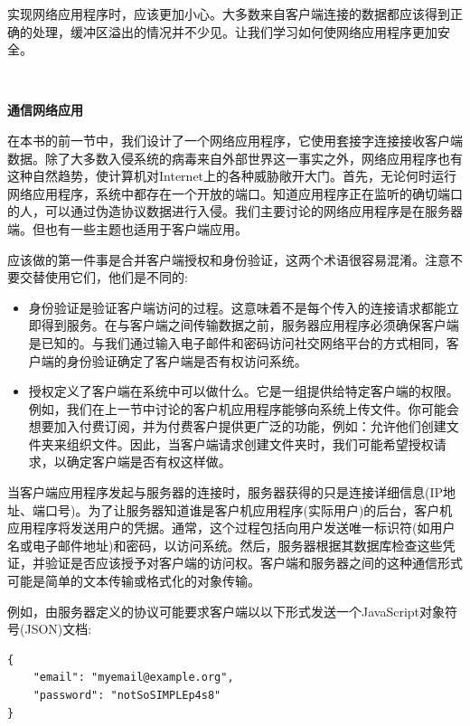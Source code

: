 实现网络应用程序时，应该更加小心。大多数来自客户端连接的数据都应该得到正确的处理，缓冲区溢出的情况并不少见。让我们学习如何使网络应用程序更加安全。 \par

\noindent\textbf{}\ \par
\textbf{通信网络应用} \ \par
在本书的前一节中，我们设计了一个网络应用程序，它使用套接字连接接收客户端数据。除了大多数入侵系统的病毒来自外部世界这一事实之外，网络应用程序也有这种自然趋势，使计算机对Internet上的各种威胁敞开大门。首先，无论何时运行网络应用程序，系统中都存在一个开放的端口。知道应用程序正在监听的确切端口的人，可以通过伪造协议数据进行入侵。我们主要讨论的网络应用程序是在服务器端。但也有一些主题也适用于客户端应用。 \par
应该做的第一件事是合并客户端授权和身份验证，这两个术语很容易混淆。注意不要交替使用它们，他们是不同的: \par

\begin{itemize}
	\item 身份验证是验证客户端访问的过程。这意味着不是每个传入的连接请求都能立即得到服务。在与客户端之间传输数据之前，服务器应用程序必须确保客户端是已知的。与我们通过输入电子邮件和密码访问社交网络平台的方式相同，客户端的身份验证确定了客户端是否有权访问系统。
	\item 授权定义了客户端在系统中可以做什么。它是一组提供给特定客户端的权限。例如，我们在上一节中讨论的客户机应用程序能够向系统上传文件。你可能会想要加入付费订阅，并为付费客户提供更广泛的功能，例如：允许他们创建文件夹来组织文件。因此，当客户端请求创建文件夹时，我们可能希望授权请求，以确定客户端是否有权这样做。
\end{itemize}

当客户端应用程序发起与服务器的连接时，服务器获得的只是连接详细信息(IP地址、端口号)。为了让服务器知道谁是客户机应用程序(实际用户)的后台，客户机应用程序将发送用户的凭据。通常，这个过程包括向用户发送唯一标识符(如用户名或电子邮件地址)和密码，以访问系统。然后，服务器根据其数据库检查这些凭证，并验证是否应该授予对客户端的访问权。客户端和服务器之间的这种通信形式可能是简单的文本传输或格式化的对象传输。 \par
例如，由服务器定义的协议可能要求客户端以以下形式发送一个JavaScript对象符号(JSON)文档: \par

\begin{lstlisting}[caption={}]
{
	"email": "myemail@example.org",
	"password": "notSoSIMPLEp4s8"
}
\end{lstlisting}


